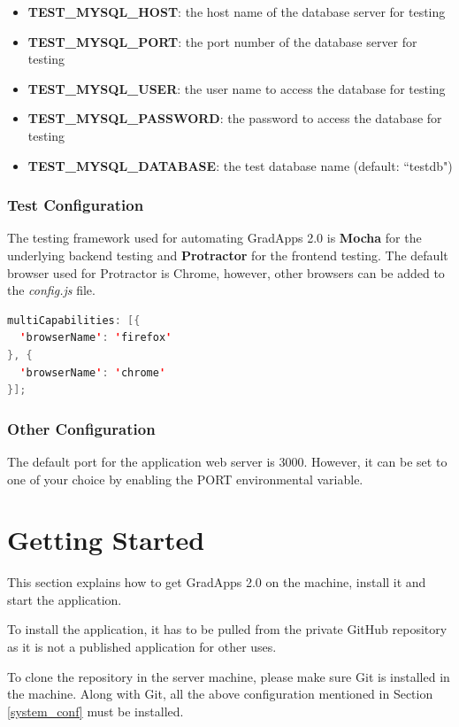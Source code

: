 \documentclass[fontsize=12pt,paper=letter,twoside]{scrartcl}
\begin{document}
\begin{itemize}
\item \textbf{TEST\_MYSQL\_HOST}: the host name of the database server for testing
\item \textbf{TEST\_MYSQL\_PORT}: the port number of the database server for testing
\item \textbf{TEST\_MYSQL\_USER}: the user name to access the database for testing
\item \textbf{TEST\_MYSQL\_PASSWORD}: the password to access the database for testing
\item \textbf{TEST\_MYSQL\_DATABASE}: the test database name (default: ``testdb")
\end{itemize}

\subsubsection{Test Configuration}
The testing framework used for automating GradApps 2.0 is \textbf{Mocha} for the underlying backend testing and \textbf{Protractor} for the frontend testing. The default browser used for Protractor is Chrome, however, other browsers can be added to the \emph{config.js} file.

\begin{lstlisting}[language=java]
multiCapabilities: [{
  'browserName': 'firefox'
}, {
  'browserName': 'chrome'
}];
\end{lstlisting}

\subsubsection{Other Configuration}
The default port for the application web server is 3000. However, it can be set to one of your choice by enabling the PORT environmental variable.

\newpage
\section{Getting Started}
This section explains how to get GradApps 2.0 on the machine, install it and start the application.

\bigskip
\noindent To install the application, it has to be pulled from the private GitHub repository as it is not a published application for other uses.

\bigskip
\noindent To clone the repository in the server machine, please make sure Git is installed in the machine. Along with Git, all the above configuration mentioned in Section \ref{system_conf} must be installed.
\end{document}
